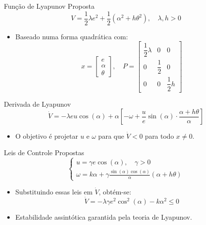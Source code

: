 \documentclass{beamer}
\begin{document}
\begin{frame}{Função de Lyapunov Proposta}
  \[
  V = \frac{1}{2} \lambda e^2 + \frac{1}{2}(\alpha^2 + h \theta^2), \quad \lambda, h > 0
  \]

  \begin{itemize}
    \item Baseado numa forma quadrática com:
    \[
    x = \begin{bmatrix} e \\ \alpha \\ \theta \end{bmatrix}, \quad
    P =
    \begin{bmatrix}
        \dfrac{1}{2}\lambda & 0 & 0\\
        0 & \dfrac{1}{2} & 0\\
        0 & 0 & \dfrac{1}{2}h
    \end{bmatrix}
    \]
  \end{itemize}
\end{frame}

\begin{frame}{Derivada de Lyapunov}
  \begin{equation*}
  \dot{V} = -\lambda e u \cos(\alpha) + \alpha \left[ -\omega + \frac{u}{e} \sin(\alpha) \cdot \frac{\alpha + h\theta}{\alpha} \right]
  \end{equation*}

  \begin{itemize}
    \item O objetivo é projetar $u$ e $\omega$ para que $\dot{V} < 0$ para todo $x \neq 0$.
  \end{itemize}
\end{frame}

\begin{frame}{Leis de Controle Propostas}
  \[
  \begin{cases}
  u = \gamma e \cos(\alpha), \quad \gamma > 0 \\
  \omega = k\alpha + \gamma \frac{\sin(\alpha) \cos(\alpha)}{\alpha} (\alpha + h\theta)
  \end{cases}
  \]

  \begin{itemize}
    \item Substituindo essas leis em $\dot{V}$, obtém-se:
    \[
    \dot{V} = -\lambda \gamma e^2 \cos^2(\alpha) - k\alpha^2 \leq 0
    \]
    \item Estabilidade assintótica garantida pela teoria de Lyapunov.
  \end{itemize}
\end{frame}
\end{document}
